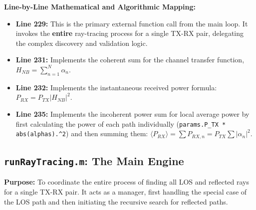 \documentclass{article}
\begin{document}
	\textbf{Line-by-Line Mathematical and Algorithmic Mapping:}
	\begin{itemize}
		\item \textbf{Line 229:} This is the primary external function call from the main loop. It invokes the \textbf{entire} ray-tracing process for a single TX-RX pair, delegating the complex discovery and validation logic.
		\item \textbf{Line 231:} Implements the coherent sum for the channel transfer function, $H_{NB} = \sum_{n=1}^{N} \alpha_n$.
		\item \textbf{Line 232:} Implements the instantaneous received power formula: $P_{RX} = P_{TX} |H_{NB}|^2$.
		\item \textbf{Line 235:} Implements the incoherent power sum for local average power by first calculating the power of each path individually (\texttt{params.P\_TX * abs(alphas).\textasciicircum2}) and then summing them: $\langle P_{RX} \rangle = \sum P_{RX,n} = P_{TX} \sum |\alpha_n|^2$.
	\end{itemize}
	
	\subsection{\texttt{runRayTracing.m}: The Main Engine}
	\textbf{Purpose:} To coordinate the entire process of finding all LOS and reflected rays for a single TX-RX pair. It acts as a manager, first handling the special case of the LOS path and then initiating the recursive search for reflected paths.
	
\end{document}
